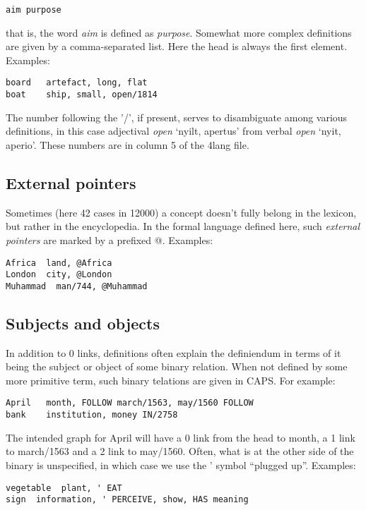 \documentclass[11pt,bookmarks,bookmarksnumbered,naturalnames,plainpages=false,pdftex,colorlinks=true,urlcolor=blue,bookmarksdepth=subsection,plainpages=false]{paper}
\begin{document}
{\tt aim   purpose}

\noindent
that is, the word {\it aim} is defined as {\it purpose}. Somewhat more complex
definitions are given by a comma-separated list. Here the head is always the
first element. Examples:

\begin{verbatim}
board   artefact, long, flat    
boat    ship, small, open/1814  
\end{verbatim}

The number following the '/', if present, serves to disambiguate among various
definitions, in this case adjectival {\it open} `nyilt, apertus' from verbal
{\it open} `nyit, aperio'. These numbers are in column 5 of the 4lang file. 

\subsection{External pointers}\label{atsign}

Sometimes (here 42 cases in 12000) a concept doesn't fully belong in the
lexicon, but rather in the encyclopedia. In the formal language defined here,
such {\it external pointers} are marked by a prefixed @. Examples:

\begin{verbatim}
Africa	land, @Africa	
London	city, @London	
Muhammad  man/744, @Muhammad	
\end{verbatim}

\subsection{Subjects and objects}\label{subjobj}

In addition to 0 links, definitions often explain the definiendum in terms of
it being the subject or object of some binary relation. When not defined by
some more primitive term, such binary telations are given in CAPS.  For
example:

\begin{verbatim}
April   month, FOLLOW march/1563, may/1560 FOLLOW
bank    institution, money IN/2758
\end{verbatim}

\noindent
The intended graph for April will have a 0 link from the head to month, a 1
link to march/1563 and a 2 link to may/1560. Often, what is at the other side
of the binary is unspecified, in which case we use the ' symbol ``plugged
up''.  Examples:

\begin{verbatim}
vegetable  plant, ' EAT
sign  information, ' PERCEIVE, show, HAS meaning
\end{verbatim}
\end{document}
